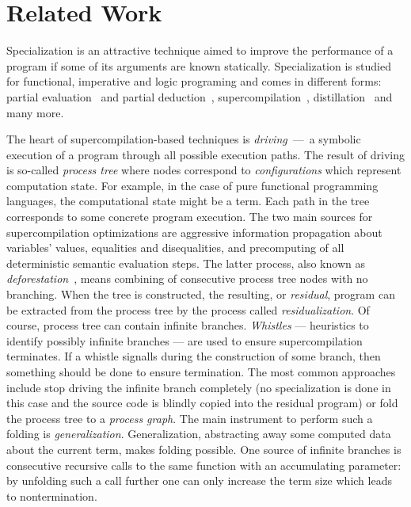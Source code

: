 \section{Related Work}

Specialization is an attractive technique aimed to improve the performance of a program if some of its arguments are known statically.
Specialization is studied for functional, imperative and logic programing and comes in different forms: partial evaluation~\cite{jonesbook} and partial deduction~\cite{lloyd1991partial}, supercompilation~\cite{soerensen1996positive}, distillation~\cite{hamilton2007distillation} and many more.


The heart of supercompilation-based techniques is \emph{driving}~---~a symbolic execution of a program through all possible execution paths.
The result of driving is so-called \emph{process tree} where nodes correspond to \emph{configurations} which represent computation state.
For example, in the case of pure functional programming languages, the computational state might be a term.
Each path in the tree corresponds to some concrete program execution.
The two main sources for supercompilation optimizations are aggressive information propagation about variables' values, equalities and disequalities, and precomputing of all deterministic semantic evaluation steps.
The latter process, also known as \emph{deforestation}~\cite{deforestation}, means  combining of consecutive process tree nodes with no branching.
When the tree is constructed, the resulting, or \emph{residual}, program can be extracted from the process tree by the process called \emph{residualization}.
Of course, process tree can contain infinite branches.
\emph{Whistles} --- heuristics to identify possibly infinite branches --- are used to ensure supercompilation terminates.
If a whistle signalls during the construction of some branch, then something should be done to ensure termination.
The most common approaches include stop driving the infinite branch completely (no specialization is done in this case and the source code is blindly copied into the residual program) or fold the process tree to a \emph{process graph}.
The main instrument to perform such a folding is \emph{generalization}.
Generalization, abstracting away some computed data about the current term, makes folding possible.
One source of infinite branches is consecutive recursive calls to the same function with an accumulating parameter: by unfolding such a call further one can only increase the term size which leads to nontermination.
